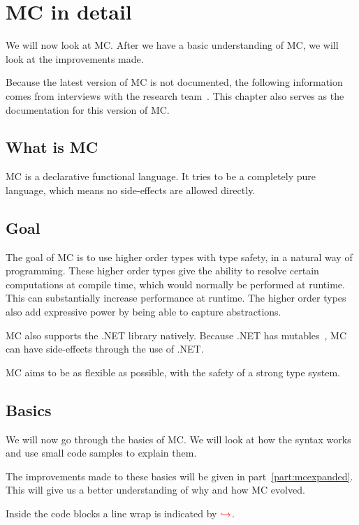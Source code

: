 \chapter{MC in detail}\label{chap:basicmc}
We will now look at MC.
After we have a basic understanding of MC, we will look at the improvements made.

Because the latest version of MC is not documented, the following information comes from interviews with the research team~\cite{researchteaminterview}.
This chapter also serves as the documentation for this version of MC.


\section{What is MC}\label{sec:whatismc}
MC is a declarative functional language.
It tries to be a completely pure language, which means no side-effects are allowed directly.


\section{Goal}\label{sec:goalofmc}
The goal of MC is to use higher order types with type safety, in a natural way of programming.
These higher order types give the ability to resolve certain computations at compile time, which would normally be performed at runtime.
This can substantially increase performance at runtime.
The higher order types also add expressive power by being able to capture abstractions.

MC also supports the .NET library natively.
Because .NET has mutables~\cite{dotnetdescription}, MC can have side-effects through the use of .NET.

MC aims to be as flexible as possible, with the safety of a strong type system.


\section{Basics}
We will now go through the basics of MC.
We will look at how the syntax works and use small code samples to explain them.

The improvements made to these basics will be given in part~\ref{part:mcexpanded}.
This will give us a better understanding of why and how MC evolved.

Inside the code blocks a line wrap is indicated by \ensuremath{\color{red}\hookrightarrow\space}.


